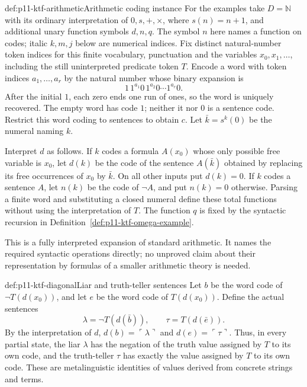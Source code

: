 \begin{hbdefinition}{def:p11-ktf-arithmetic}{Arithmetic coding instance}
For the examples take \(D=\mathbb N\) with its ordinary interpretation
of \(0,s,+,\times\), where \(s(n)=n+1\), and additional unary function
symbols \(d,n,q\). The symbol \(n\) here names a function on codes;
italic \(k,m,j\) below are numerical indices. Fix distinct natural-number
token indices for this finite vocabulary, punctuation and the variables
\(x_0,x_1,\ldots\), including the still uninterpreted predicate token
\(T\). Encode a word with token indices \(a_1,\ldots,a_r\) by the
natural number whose binary expansion is
\[
 1\,1^{a_1}0\,1^{a_2}0\cdots1^{a_r}0.
\]
After the initial \(1\), each zero ends one run of ones, so the word is
uniquely recovered. The empty word has code \(1\); neither it nor \(0\)
is a sentence code. Restrict this word coding to sentences to obtain \(c\).
Let \(\bar k=s^k(0)\) be the numeral naming \(k\).

Interpret \(d\) as follows. If \(k\) codes a formula \(A(x_0)\) whose
only possible free variable is \(x_0\), let \(d(k)\) be the code of
the sentence \(A(\bar k)\) obtained by replacing its free occurrences
of \(x_0\) by \(\bar k\). On all other inputs put \(d(k)=0\).
If \(k\) codes a sentence \(A\), let \(n(k)\) be the code of
\(\neg A\), and put \(n(k)=0\) otherwise. Parsing a finite word and
substituting a closed numeral define these total functions without using
the interpretation of \(T\). The function \(q\) is fixed by the
syntactic recursion in Definition~\ref{def:p11-ktf-omega-example}.

This is a fully interpreted expansion of standard arithmetic. It names
the required syntactic operations directly; no unproved claim about their
representation by formulas of a smaller arithmetic theory is needed.
\end{hbdefinition}

\begin{hbdefinition}{def:p11-ktf-diagonal}{Liar and truth-teller sentences}
Let \(b\) be the word code of \(\neg T(d(x_0))\), and let \(e\) be
the word code of \(T(d(x_0))\). Define the actual sentences
\[
 \lambda=\neg T(d(\bar b)),\qquad
 \tau=T(d(\bar e)).
\]
By the interpretation of \(d\),
\(d(b)=\ulcorner\lambda\urcorner\) and
\(d(e)=\ulcorner\tau\urcorner\). Thus, in every partial state,
the liar \(\lambda\) has the negation of the truth value assigned by
\(T\) to its own code, and the truth-teller \(\tau\) has exactly the
value assigned by \(T\) to its own code. These are metalinguistic
identities of values derived from concrete strings and terms.
\end{hbdefinition}

